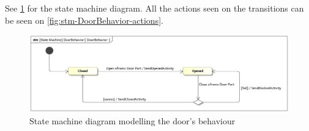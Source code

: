 \documentclass[a4paper]{article}
\begin{document}
See \cref{fig:stm-DoorBehavior} for the state machine diagram. All the actions
seen on the transitions can be seen on \cref{fig:stm-DoorBehavior-actions}.

\begin{figure}[hb]
	\includegraphics[width=\textwidth]{stm-DoorBehavior.jpg}
	\caption{State machine diagram modelling the door's behaviour}%
	\label{fig:stm-DoorBehavior}
\end{figure}
\end{document}
